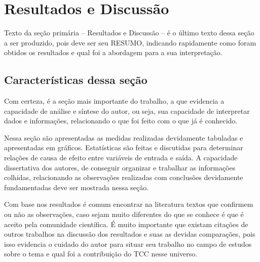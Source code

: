 \chapter{Resultados e Discussão}

Texto da seção primária – Resultados e Discussão -- é o último texto dessa seção a ser produzido, pois deve ser seu RESUMO, indicando rapidamente como foram obtidos os resultados e qual foi a abordagem para a sua interpretação.

\section{Características dessa seção}

Com certeza, é a seção mais importante do trabalho, a que evidencia a capacidade de análise e síntese do autor, ou seja, sua capacidade de interpretar dados e informações, relacionando o que foi feito com o que já é conhecido.

Nessa seção são apresentadas as medidas realizadas devidamente tabuladas e apresentadas em gráficos. Estatísticas são feitas e discutidas para determinar relações de causa de efeito entre variáveis de entrada e saída. A capacidade dissertativa dos autores, de conseguir organizar e trabalhar as informações colhidas, relacionando as observações realizadas com conclusões devidamente fundamentadas deve ser mostrada nessa seção.

Com base nos resultados é comum encontrar na literatura textos que confirmem ou não as observações, caso sejam muito diferentes do que se conhece é que é aceito pela comunidade científica. É muito importante que existam citações de outros trabalhos na discussão dos resultados e suas as devidas comparações, pois isso evidencia o cuidado do autor para situar seu trabalho no campo de estudos sobre o tema e qual foi a contribuição do TCC nesse universo.